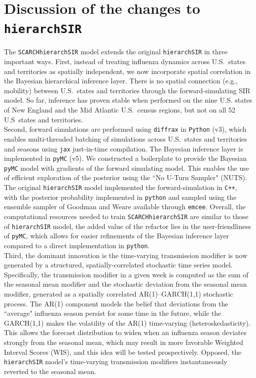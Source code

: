 \documentclass[11pt]{article}
\begin{document}
\section{Discussion of the changes to \texttt{hierarchSIR}}

The \texttt{SCARCHhierarchSIR} model extends the original \texttt{hierarchSIR} in three important ways. First, instead of treating influenza dynamics across U.S.\ states and territories as spatially independent, we now incorporate spatial correlation in the Bayesian hierarchical inference layer. There is no spatial connection (e.g., mobility) between U.S.\ states and territories through the forward-simulating SIR model. So far, inference has proven stable when performed on the nine U.S. states of New England and the Mid Atlantic U.S.\ census regions, but not on all 52 U.S\ states and territories.\\

Second, forward simulations are performed using \texttt{diffrax} in \texttt{Python} (v3), which enables multi-threaded batching of simulations across U.S.\ states and territories and seasons using \texttt{jax} just-in-time compilation. The Bayesian inference layer is implemented in \texttt{pyMC} (v5). We constructed a boilerplate to provide the Bayesian \texttt{pyMC} model with gradients of the forward simulating model. This enables the use of efficient exploration of the posterior using the ``No U-Turn Sampler" (NUTS).\\

The original \texttt{hierarchSIR} model implemented the forward-simulation in \texttt{C++}, with the posterior probability implemented in \texttt{python} and sampled using the ensemble sampler of Goodman and Weare available through \texttt{emcee}. Overall, the computational resources needed to train \texttt{SCARCHhierarchSIR} are similar to those of \texttt{hierarchSIR} model, the added value of the refactor lies in the user-friendliness of \texttt{pyMC}, which allows for easier refinements of the Bayesian inference layer compared to a direct implementation in \texttt{python}.\\

Third, the dominant innovation is the time-varying transmission modifier is now generated by a structured, spatially-correlated stochastic time series model. Specifically, the transmission modifier in a given week is computed as the sum of the seasonal mean modifier and the stochastic deviation from the seasonal mean modifier, generated as a spatially correlated AR(1)--GARCH(1,1) stochastic process. The AR(1) component models the belief that deviations from the ``average" influenza season persist for some time in the future, while the GARCH(1,1) makes the volatility of the AR(1) time-varying (heteroskedasticity). This allows the forecast distribution to widen when an influenza season deviates strongly from the seasonal mean, which may result in more favorable Weighted Interval Scores (WIS), and this idea will be tested prospectively. Opposed, the \texttt{hierarchSIR} model's time-varying transmission modifiers instantaneously reverted to the seasonal mean. 
\end{document}
